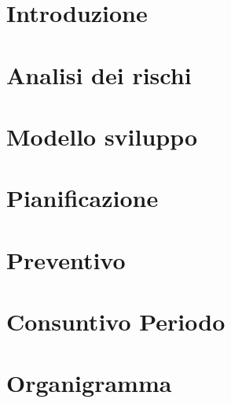 \documentclass[a4paper, oneside, openany, dvipsnames, table]{article}
\begin{document}
    \copertina{}
    
    \newpage
    \tableofcontents
    \newpage
    \listoftables
    \newpage
    \listoffigures
    
    \newpage
    \section{Introduzione}\label{sec:Introduzione}
    

    \newpage
    \section{Analisi dei rischi}\label{sec:Analisi-rischi}
    

    \newpage
    \section{Modello sviluppo}\label{sec:Modello-sviluppo}
    

    \newpage
    \section{Pianificazione}\label{sec:Pianificazione}
    

    \newpage
    \section{Preventivo}\label{sec:Preventivo}
    

    \newpage
    \section{Consuntivo Periodo}\label{sec:Consuntivo-periodo}
    

    \newpage
    \section{Organigramma}\label{sec:Organigramma}
    
\end{document}
